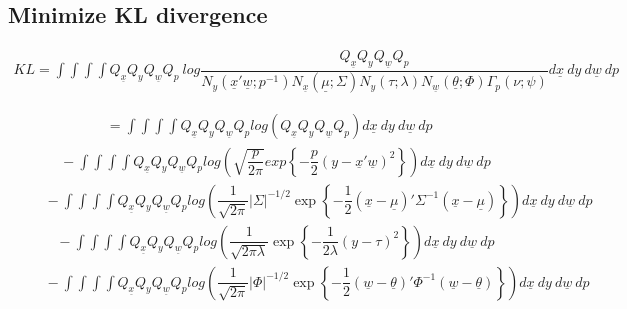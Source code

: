 \documentclass[fleqn]{minimal}
\begin{document}
\subsection{Minimize KL divergence}

\begin{align*}
  KL =
  \int \int \int \int
  Q_{\underline{x}} Q_{y} Q_{\underline{w}} Q_{p}
  \ log
  \dfrac
  {
    Q_{\underline{x}} Q_{y} Q_{\underline{w}} Q_{p}
  }
  {
    N_y\left(\underline{x}'\underline{w} ; p^{-1}\right)
    N_{\underline{x}} \left( \underline{\mu} ; \Sigma\right)
    N_{y} \left( \tau ; \lambda\right)
    N_{\underline{w}} \left( \underline{\theta} ; \Phi\right)
    \Gamma_p \left( \nu ; \psi \right)
  }
  d\underline{x} \ dy \ d\underline{w} \ dp
\end{align*}

\begin{align*}
  \ \ \ \ \ \
  = 
  \int \int \int \int
  Q_{\underline{x}} Q_{y} Q_{\underline{w}} Q_{p}
  log \left(
    Q_{\underline{x}} Q_{y} Q_{\underline{w}} Q_{p}
  \right)
  d\underline{x} \ dy \ d\underline{w} \ dp
\end{align*}
\begin{align*}
  \ \ \ \ \ \ \ \ \ \
  - \int \int \int \int
  Q_{\underline{x}} Q_{y} Q_{\underline{w}} Q_{p}
  log \left(
    \sqrt{\dfrac{p}{2\pi}}
    exp
    \left\{
      -\dfrac{p}{2}
      \left( y - \underline{x}'\underline{w}\right)^2
    \right\}
  \right)
  d\underline{x} \ dy \ d\underline{w} \ dp
\end{align*}
\begin{align*}
  \ \ \ \ \ \ \ \ \ \
  - \int \int \int \int
  Q_{\underline{x}} Q_{y} Q_{\underline{w}} Q_{p}
  log \left(
    \dfrac{1}{\sqrt{2\pi}}
    \left| \Sigma \right|^{-1/2}
    \exp
    \left\{
      - \dfrac{1}{2}
      \left( \underline{x} - \underline{\mu}\right)'
      \Sigma^{-1}
      \left( \underline{x} - \underline{\mu}\right)
    \right\}
  \right)
  d\underline{x} \ dy \ d\underline{w} \ dp
\end{align*}
\begin{align*}
  \ \ \ \ \ \ \ \ \ \
  - \int \int \int \int
  Q_{\underline{x}} Q_{y} Q_{\underline{w}} Q_{p}
  log \left(
    \dfrac{1}{\sqrt{2\pi\lambda}}
    \exp
    \left\{
      - \dfrac{1}{2\lambda}
      \left(y - \tau\right)^2
    \right\}
  \right)
  d\underline{x} \ dy \ d\underline{w} \ dp
\end{align*}
\begin{align*}
  \ \ \ \ \ \ \ \ \ \
  - \int \int \int \int
  Q_{\underline{x}} Q_{y} Q_{\underline{w}} Q_{p}
  log \left(
    \dfrac{1}{\sqrt{2\pi}}
    \left| \Phi \right|^{-1/2}
    \exp
    \left\{
      - \dfrac{1}{2}
      \left( \underline{w} - \underline{\theta}\right)'
      \Phi^{-1}
      \left( \underline{w} - \underline{\theta}\right)
    \right\}
  \right)
  d\underline{x} \ dy \ d\underline{w} \ dp
\end{align*}
\end{document}
